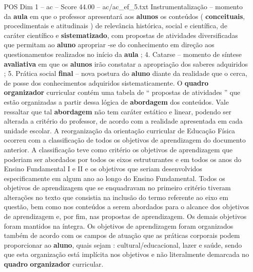 \begin{textsample}{POS Dim 1 – ac – Score 44.00 – ac/ac\_ef\_5.txt}
Instrumentalização – momento da \textbf{aula} em que o professor apresentará aos \textbf{alunos} os conteúdos ( \textbf{conceituais}, procedimentais e atitudinais ) de relevância histórica, social e científica, de caráter científico e \textbf{sistematizado}, com propostas de atividades diversificadas que permitam ao \textbf{aluno} apropriar -se do conhecimento em direção aos questionamentos realizados no início da \textbf{aula} ; 4.
Catarse – momento de síntese \textbf{avaliativa} em que os \textbf{alunos} irão constatar a apropriação dos saberes adquiridos ; 5.
Prática social \textbf{final} – nova postura do \textbf{aluno} diante da realidade que o cerca, de posse dos conhecimentos adquiridos sistematicamente.
O \textbf{quadro} \textbf{organizador} curricular contém uma tabela de “ propostas de atividades ” que estão organizadas a partir dessa lógica de \textbf{abordagem} dos conteúdos.
Vale ressaltar que tal \textbf{abordagem} não tem caráter estático e linear, podendo ser alterada a critério do professor, de acordo com a realidade apresentada em cada unidade escolar.
A reorganização da orientação curricular de Educação Física ocorreu com a classificação de todos os objetivos de aprendizagem do documento anterior.
A classificação teve como critério os objetivos de aprendizagem que poderiam ser abordados por todos os eixos estruturantes e em todos os anos do Ensino Fundamental I e II e os objetivos que seriam desenvolvidos especificamente em algum ano ao longo do Ensino Fundamental.
Todos os objetivos de aprendizagem que se enquadravam no primeiro critério tiveram alterações no texto que consistia na inclusão do termo referente ao eixo em questão, bem como nos conteúdos a serem abordados para o alcance dos objetivos de aprendizagem e, por fim, nas propostas de aprendizagem.
Os demais objetivos foram mantidos na íntegra.
Os objetivos de aprendizagem foram organizados também de acordo com os campos de atuação que as práticas corporais podem proporcionar ao \textbf{aluno}, quais sejam : cultural/educacional, lazer e saúde, sendo que esta organização está implícita nos objetivos e não literalmente demarcada no \textbf{quadro} \textbf{organizador} curricular.

\end{textsample}
